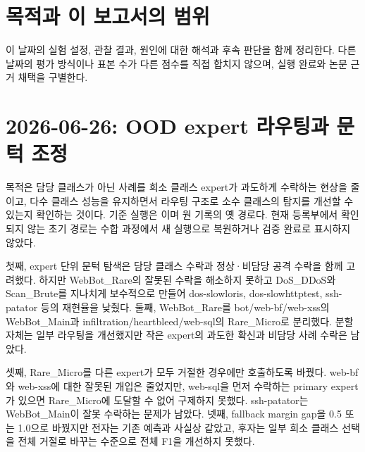 




\section*{목적과 이 보고서의 범위}

이 날짜의 실험 설정, 관찰 결과, 원인에 대한 해석과 후속 판단을 함께 정리한다. 다른 날짜의 평가 방식이나 표본 수가 다른 점수를 직접 합치지 않으며, 실행 완료와 논문 근거 채택을 구별한다.


\section{2026-06-26: OOD expert 라우팅과 문턱 조정}
\label{report:20260626_ood}

목적은 담당 클래스가 아닌 사례를 희소 클래스 expert가 과도하게 수락하는 현상을 줄이고,
다수 클래스 성능을 유지하면서 라우팅 구조로 소수 클래스의 탐지를 개선할 수 있는지 확인하는 것이다.
기준 실행은 이며 원 기록의 옛 경로다.
현재 등록부에서 확인되지 않는 초기 경로는 수합 과정에서 새 실행으로 복원하거나 검증 완료로 표시하지 않았다.

첫째, expert 단위 문턱 탐색은 담당 클래스 수락과 정상·비담당 공격 수락을 함께 고려했다.
하지만 WebBot\_Rare의 잘못된 수락을 해소하지 못하고 DoS\_DDoS와 Scan\_Brute를 지나치게 보수적으로 만들어
dos-slowloris, dos-slowhttptest, ssh-patator 등의 재현율을 낮췄다.
둘째, WebBot\_Rare를 bot/web-bf/web-xss의 WebBot\_Main과
infiltration/heartbleed/web-sql의 Rare\_Micro로 분리했다.
분할 자체는 일부 라우팅을 개선했지만 작은 expert의 과도한 확신과 비담당 사례 수락은 남았다.

셋째, Rare\_Micro를 다른 expert가 모두 거절한 경우에만 호출하도록 바꿨다.
web-bf와 web-xss에 대한 잘못된 개입은 줄었지만, web-sql을 먼저 수락하는 primary expert가 있으면
Rare\_Micro에 도달할 수 없어 구제하지 못했다.
ssh-patator는 WebBot\_Main이 잘못 수락하는 문제가 남았다.
넷째, fallback margin gap을 0.5 또는 1.0으로 바꿨지만 전자는 기존 예측과 사실상 같았고,
후자는 일부 희소 클래스 선택을 전체 거절로 바꾸는 수준으로 전체 F1을 개선하지 못했다.

